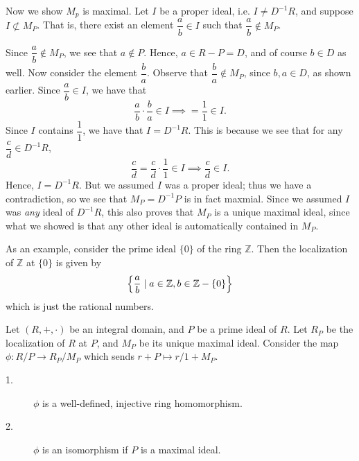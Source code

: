\begin{prf}
\begin{description}
        Now we show $M_p$ is maximal. Let $I$ be a proper ideal, i.e. $I
        \ne D^{-1}R$, and suppose $I
        \not\subset M_P$. That is, there exist an element
        $\dfrac{a}{b} \in I$ such that $\dfrac{a}{b} \not\in M_P$.
        
        Since $\dfrac{a}{b} \not\in M_P$, we see that $a \not\in P$.
        Hence, $a \in R - P = D$, and of course $b \in D$ as well. Now
        consider the element $\dfrac{b}{a}$. Observe that
        $\dfrac{b}{a} \not\in M_P$, since $b, a \in D$, as shown
        earlier. Since $\dfrac{a}{b} \in I$, we have that 
        \[
            \dfrac{a}{b}\cdot \dfrac{b}{a} \in I \implies = \dfrac{1}{1} \in I.
        \]
        Since $I$ contains $\dfrac{1}{1}$, we have that $I = D^{-1}R$.
        This is because we see that for any
        $\dfrac{c}{d} \in D^{-1}R$, 
        \[
            \dfrac{c}{d} =\dfrac{c}{d}\cdot\dfrac{1}{1} \in I \implies \dfrac{c}{d} \in I.
        \]
        Hence, $I = D^{-1}R$. But we assumed $I$ was a proper ideal; thus we
        have a contradiction, so we see that $M_P = D^{-1}P$ is in fact maxmial.
        Since we assumed $I$ was \textit{any} ideal of $D^{-1}R$, this
        also proves that $M_P$ is a unique maximal ideal, since what we
        showed is that any other ideal is automatically contained in
        $M_P$. 
    \end{description}
\end{prf}

As an example, consider the prime ideal $\{0\}$ of the ring
$\mathbb{Z}$. Then the localization of $\mathbb{Z}$ at $\{0\}$ is
given by 
\[
    \left\{ \dfrac{a}{b} \mid a \in \mathbb{Z}, b \in \mathbb{Z} - \{0\}  \right\}
\]
which is just the rational numbers. 

\begin{thm}
    Let $(R, +, \cdot)$ be an integral domain, and $P$ be a prime
    ideal of $R$. Let $R_P$ be the localization of $R$ at $P$, and
    $M_P$ be its unique maximal ideal. Consider the map $\phi: R/P
    \to R_P/M_P$ which sends $r + P \mapsto r/1 + M_P$. 
    \begin{description}
        \item[1.] $\phi$ is a well-defined, injective ring
        homomorphism. 
        \item[2.] $\phi$ is an isomorphism if $P$ is a
        maximal ideal. 
    \end{description}
\end{thm}

